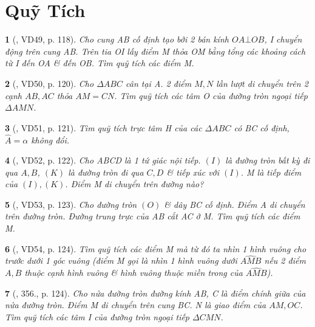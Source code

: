 \documentclass{article}
\newtheorem{baitoan}{}
\begin{document}
\section{Quỹ Tích}

\begin{baitoan}[\cite{Binh_Toan_9_tap_2}, VD49, p. 118]
	Cho cung AB cố định tạo bởi 2 bán kính $OA\bot OB$, I chuyển động trên cung AB. Trên tia OI lấy điểm M thỏa OM bằng tổng các khoảng cách từ I đến OA \& đến OB. Tìm quỹ tích các điểm M.
\end{baitoan}

\begin{baitoan}[\cite{Binh_Toan_9_tap_2}, VD50, p. 120]
	Cho $\Delta ABC$ cân tại A. 2 điểm $M,N$ lần lượt di chuyển trên 2 cạnh $AB,AC$ thỏa $AM = CN$. Tìm quỹ tích các tâm O của đường tròn ngoại tiếp $\Delta AMN$.
\end{baitoan}

\begin{baitoan}[\cite{Binh_Toan_9_tap_2}, VD51, p. 121]
	Tìm quỹ tích trực tâm H của các $\Delta ABC$ có BC cố định, $\widehat{A} = \alpha$ không đổi.
\end{baitoan}

\begin{baitoan}[\cite{Binh_Toan_9_tap_2}, VD52, p. 122]
	Cho ABCD là 1 tứ giác nội tiếp. $(I)$ là đường tròn bất kỳ đi qua $A,B$, $(K)$ là đường tròn đi qua $C,D$ \& tiếp xúc với $(I)$. M là tiếp điểm của $(I),(K)$. Điểm M di chuyển trên đường nào?
\end{baitoan}

\begin{baitoan}[\cite{Binh_Toan_9_tap_2}, VD53, p. 123]
	Cho đường tròn $(O)$ \& dây BC cố định. Điểm A di chuyển trên đường tròn. Đường trung trực của AB cắt AC ở M. Tìm quỹ tích các điểm M.
\end{baitoan}

\begin{baitoan}[\cite{Binh_Toan_9_tap_2}, VD54, p. 124]
	Tìm quỹ tích các điểm M mà từ đó ta nhìn 1 hình vuông cho trước dưới 1 góc vuông (điểm M gọi là {\rm nhìn 1 hình vuông dưới $\widehat{AMB}$} nếu 2 điểm $A,B$ thuộc cạnh hình vuông \& hình vuông thuộc miền trong của $\widehat{AMB}$).
\end{baitoan}

\begin{baitoan}[\cite{Binh_Toan_9_tap_2}, 356., p. 124]
	Cho nửa đường tròn đường kính AB, C là điểm chính giữa của nửa đường tròn. Điểm M di chuyển trên cung BC. N là giao điểm của $AM,OC$. Tìm quỹ tích các tâm I của đường tròn ngoại tiếp $\Delta CMN$.
\end{baitoan}
\end{document}
